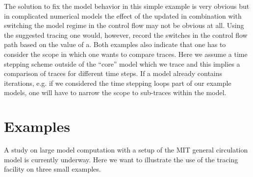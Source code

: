 \documentclass{article}
\begin{document}
The solution to fix the model behavior in this simple example is very obvious
but in complicated numerical models the effect of the updated in combination with 
switching the model regime in the control flow may not be obvious at all. 
Using the suggested tracing one would, however, record the switches in 
the control flow path based on the value of a. 
Both examples also indicate that one has to consider the  scope in which 
one wants to compare traces. Here we assume a time stepping scheme 
outside of the ``core'' model which we trace and this implies a comparison 
of traces for different time steps.  
If a model already contains iterations, e.g. if we considered the time stepping 
loops part of our example models, one will have to narrow the scope to 
sub-traces within the model. 

\section{Examples}
A study on large model computation with  a setup of the MIT general circulation model 
is currently underway.  
Here we want to illustrate the use of the tracing facility on three small examples.
\end{document}
